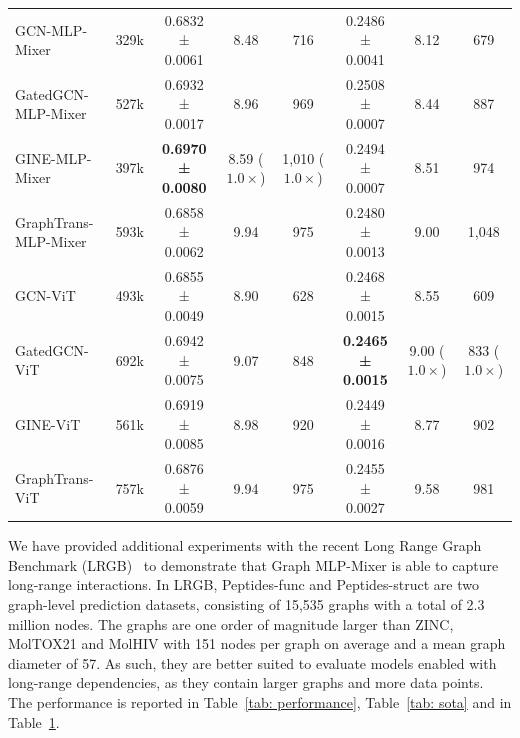 \documentclass{article}
\begin{document}
\begin{table}[!ht]
\begin{tabular}{lccccccc}
         \midrule
         GCN-MLP-Mixer & {329k}
         & {0.6832 ± 0.0061} & {8.48} & {716}
         & {0.2486 ± 0.0041} & {8.12} & {679} \\
         
         GatedGCN-MLP-Mixer & {527k} 
         & {0.6932 ± 0.0017} & {8.96} & {969}
         & {0.2508 ± 0.0007} & {8.44} & {887} \\
         
         GINE-MLP-Mixer & {397k}
         & \bf{0.6970 ± 0.0080} & {8.59} ($1.0\times$) & {1,010} ($1.0\times$)
         & {0.2494 ± 0.0007} & {8.51} & {974} \\
         
         GraphTrans-MLP-Mixer & {593k}
         & {0.6858 ± 0.0062} & {9.94} & {975}
         & {0.2480 ± 0.0013} & {9.00} & {1,048}\\

         \midrule
         {GCN-ViT} & {493k}
         & {0.6855 ± 0.0049} & {8.90} & {628 }
         & {0.2468 ± 0.0015} & {8.55} & {609} \\
         
         {GatedGCN-ViT} & {692k} 
         & {0.6942 ± 0.0075} & {9.07} & {848}
         & \bf{0.2465 ± 0.0015} & {9.00} ($1.0\times$) & {833} ($1.0\times$)\\
         
         {GINE-ViT} & {561k}
         & {0.6919 ± 0.0085} & {8.98} & {920} 
         & {0.2449 ± 0.0016} & {8.77} & {902}\\
         
         {GraphTrans-ViT} & {757k}
         & {0.6876 ± 0.0059} & {9.94}  & {975}
         & {0.2455 ± 0.0027} & {9.58} & {981}\\
         \bottomrule 
    \end{tabular}
    \label{app tab: lrgb}
\end{table}

We have provided additional experiments with the recent Long Range Graph Benchmark (LRGB)~\citep{dwivedi2022long} to demonstrate that Graph MLP-Mixer is able to capture long-range interactions. In LRGB, Peptides-func and Peptides-struct are two graph-level prediction datasets, consisting of 15,535 graphs with a total of 2.3 million nodes. The graphs are one order of magnitude larger than ZINC, MolTOX21 and MolHIV with 151 nodes per graph on average and a mean graph diameter of 57. As such, they are better suited to evaluate models enabled with long-range dependencies, as they contain larger graphs and more data points. The performance is reported in Table~\ref{tab: performance}, Table~\ref{tab: sota} and in Table~\ref{app tab: lrgb}. 
\end{document}
